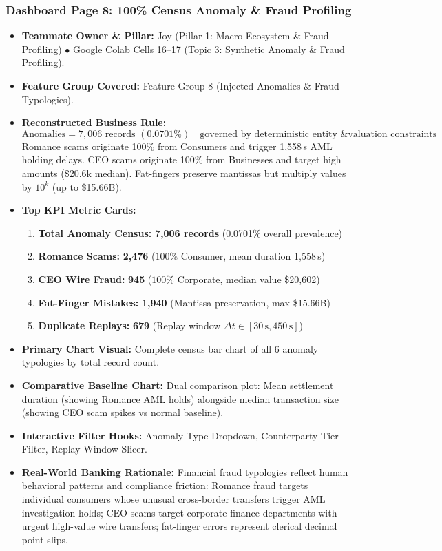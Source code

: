 \documentclass[11pt,a4paper]{article}
\begin{document}
\subsubsection{Dashboard Page 8: 100\% Census Anomaly \& Fraud Profiling}
\begin{itemize}
    \item \textbf{Teammate Owner \& Pillar:} Joy (Pillar 1: Macro Ecosystem \& Fraud Profiling) $\bullet$ Google Colab Cells 16--17 (Topic 3: Synthetic Anomaly \& Fraud Profiling).
    \item \textbf{Feature Group Covered:} Feature Group 8 (Injected Anomalies \& Fraud Typologies).
    \item \textbf{Reconstructed Business Rule:}
    \begin{equation}
    \text{Anomalies} = 7,006 \text{ records } (0.0701\%) \quad \text{governed by deterministic entity \& valuation constraints}
    \end{equation}
    Romance scams originate 100\% from Consumers and trigger 1,558\,s AML holding delays. CEO scams originate 100\% from Businesses and target high amounts (\$20.6k median). Fat-fingers preserve mantissas but multiply values by $10^k$ (up to \$15.66B).
    \item \textbf{Top KPI Metric Cards:}
    \begin{enumerate}
        \item \textbf{Total Anomaly Census:} \textbf{7,006 records} (0.0701\% overall prevalence)
        \item \textbf{Romance Scams:} \textbf{2,476} ($100\%$ Consumer, mean duration 1,558\,s)
        \item \textbf{CEO Wire Fraud:} \textbf{945} ($100\%$ Corporate, median value \$20,602)
        \item \textbf{Fat-Finger Mistakes:} \textbf{1,940} (Mantissa preservation, max \$15.66B)
        \item \textbf{Duplicate Replays:} \textbf{679} (Replay window $\Delta t \in [30\,\text{s}, 450\,\text{s}]$)
    \end{enumerate}
    \item \textbf{Primary Chart Visual:} Complete census bar chart of all 6 anomaly typologies by total record count.
    \item \textbf{Comparative Baseline Chart:} Dual comparison plot: Mean settlement duration (showing Romance AML holds) alongside median transaction size (showing CEO scam spikes vs normal baseline).
    \item \textbf{Interactive Filter Hooks:} Anomaly Type Dropdown, Counterparty Tier Filter, Replay Window Slicer.
    \item \textbf{Real-World Banking Rationale:} Financial fraud typologies reflect human behavioral patterns and compliance friction: Romance fraud targets individual consumers whose unusual cross-border transfers trigger AML investigation holds; CEO scams target corporate finance departments with urgent high-value wire transfers; fat-finger errors represent clerical decimal point slips.
\end{itemize}
\end{document}

